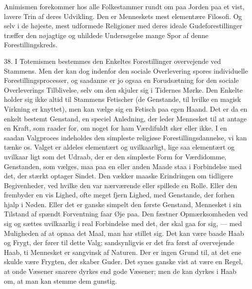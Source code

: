 \documentclass[12pt,a4paper,openany]{book}
\newcommand{\opage}[1]{\marginnote{\footnotesize\textit{[#1]}}}
\begin{document}
Animismen forekommer hos alle Folkestammer rundt om paa Jorden paa et
vist, lavere Trin af deres Udvikling. Den er Menneskets mest elementære
Filosofi. Og selv i de højeste, mest udformede Religioner med deres
ideale Gudeforestillinger træffer den nøjagtige og uhildede Undersøgelse
mange Spor af denne Forestillingskreds.

38. I Totemismen bestemmes den Enkeltes Forestillinger overvejende ved
Stammens. Men der kan dog indenfor den sociale Overlevering spores
individuelle Forestillingsprocesser, og saadanne er jo ogsaa en
Forudsætning for den sociale Overleverings Tilblivelse, selv om den
skjuler sig i Tidernes Mørke. Den Enkelte holder sig ikke altid til
Stammens Fetischer (de Genstande, til hvilke en magisk Virkning er
knyttet), men kan vælge sig en Fetisch paa egen Haand. Det er da en
enkelt bestemt Genstand, en speciel Anledning, der leder Mennesket til
at antage en Kraft, som raader for, om noget for ham Værdifuldt sker
eller ikke. I en saadan Valgproces indeholdes den simpleste religiøse
Forestillingsdannelse, vi kan tænke os. Valget er aldeles elementært og
uvilkaarligt, lige saa elementært og uvilkaar%
\opage{89}ligt som det Udraab, der er den simpleste Form for Værdidomme,
Genstanden, som vælges, maa paa en eller anden Maade staa i Forbindelse
med det, der stærkt optager Sindet. Den vækker maaske Erindringen om
tidligere Begivenheder, ved hvilke den var nærværende eller spillede en
Rolle. Eller den frembyder en vis Lighed, ofte meget fjern Lighed, med
Genstande, der forhen hjalp i Nøden. Eller det er ganske simpelt den
første Genstand, Mennesket i sin Tilstand af spændt Forventning faar Øje
paa. Den fæstner Opmærksomheden ved sig og sættes uvilkaarlig i real
Forbindelse med det, der skal gaa for sig, --- med Muligheden af at
opnaa det Maal, man har stillet sig. Det kan være baade Haab og Frygt,
der fører til dette Valg; sandsynligvis er det fra først af overvejende
Haab, ti Mennesket er sangvinsk af Naturen. Der er ingen Grund til, at
det ene skulde være Frygten, der skaber Guder. Det synes ganske vist at
være en Regel, at onde Væsener snarere dyrkes end gode Væsener; men de
kan dyrkes i Haab om, at man kan stemme dem gunstig.
\end{document}

